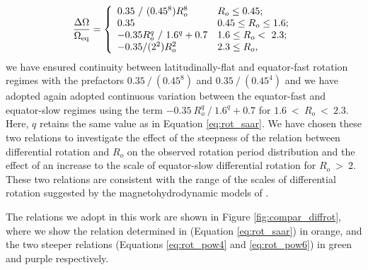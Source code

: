 \begin{equation}
\label{eq:rot_pow6}
{\centering
\frac{\Delta\Omega}{\Omega_{\rm{eq}}} = \left\{
\begin{array}{ll}
 0.35 \ / \ (0.45^8) R_o^8& R_o\leq 0.45; \\
 0.35 & 0.45\leq R_o\leq 1.6; \\
 -0.35 R_o^q \ / \ 1.6^q + 0.7 & 1.6 \leq R_o < \ 2.3;\\
 -0.35/(2^2) R_o^2 & 2.3\leq R_o, \\
\end{array} 
\right.}
\end{equation}
we have ensured continuity between latitudinally-flat and equator-fast rotation regimes with the prefactors $0.35 \ / \ (0.45^8)$ and $0.35 \ / \ (0.45^4)$ and we have adopted again adopted continuous variation between the equator-fast and equator-slow regimes using the term $-0.35 \ R_o^q \ / \ 1.6^q + 0.7$ for $1.6 \ < \ R_o \ < \ 2.3$.
Here, $q$ retains the same value as in Equation \ref{eq:rot_saar}.
We have chosen these two relations to investigate the effect of the steepness of the relation between differential rotation and $R_o$ on the observed rotation period distribution and the effect of an increase to the scale of equator-slow differential rotation for $R_o \ > \ 2$.
These two relations are consistent with the range of the scales of differential rotation suggested by the magnetohydrodynamic models of \citet{brun_powering_2022}.

The relations we adopt in this work are shown in Figure \ref{fig:compar_diffrot}, where we show the relation determined in \citet{saar_starspots_2011} (Equation \ref{eq:rot_saar}) in orange, and the two steeper relations (Equations \ref{eq:rot_pow4} and \ref{eq:rot_pow6}) in green and purple respectively.

